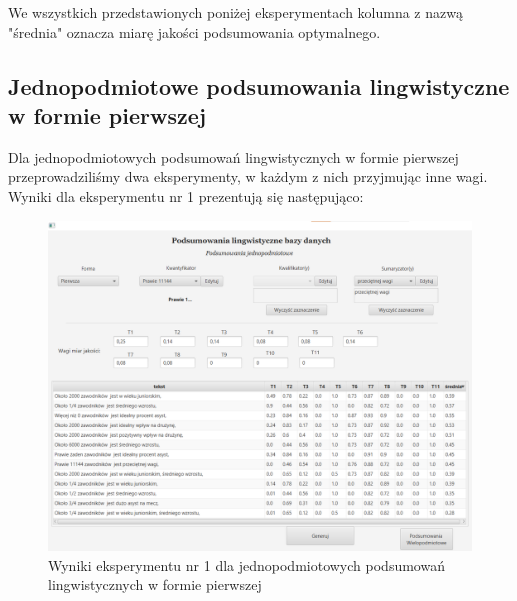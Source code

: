 \documentclass{classrep}
\begin{document}
We wszystkich przedstawionych poniżej eksperymentach kolumna z nazwą "średnia" oznacza miarę jakości podsumowania optymalnego.

\subsection{Jednopodmiotowe podsumowania lingwistyczne w formie pierwszej}

Dla jednopodmiotowych podsumowań lingwistycznych w formie pierwszej przeprowadziliśmy dwa eksperymenty, w każdym z nich przyjmując inne wagi. Wyniki dla eksperymentu nr 1 prezentują się następująco:

\begin{figure}[H]
    \centering
    \includegraphics[width = 14cm]{eksperyment1.png}
    \caption{Wyniki eksperymentu nr 1 dla jednopodmiotowych podsumowań lingwistycznych w formie pierwszej}
    \label{rysunek:forma_pierwsza_eksperyment_1}
\end{figure}
\end{document}
